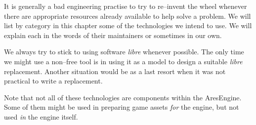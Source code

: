 

It is generally a bad engineering practise to try to re--invent the wheel whenever there are appropriate resources already available to help solve a problem. We will list by category in this chapter some of the technologies we intend to use. We will explain each in the words of their maintainers or sometimes in our own.

We always try to stick to using software {\it libre} whenever possible. The only time we might use a non--free tool is in using it as a model to design a suitable {\it libre} replacement. Another situation would be as a last resort when it was not practical to write a replacement.

Note that not all of these technologies are components within the AresEngine. Some of them might be used in preparing  game assets {\it for} the engine, but not used {\it in} the engine itself.













\StopChapter

